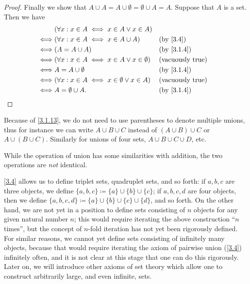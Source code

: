 \begin{proof}
  Finally we show that \(A \cup A = A \cup \emptyset = \emptyset \cup A = A\).
  Suppose that \(A\) is a set.
  Then we have
  \begin{align*}
         & (\forall x : x \in A \iff x \in A \lor x \in A)                                      \\
    \iff & (\forall x : x \in A \iff x \in A \cup A)               &  & \text{(by \cref{3.4})}  \\
    \iff & (A = A \cup A)                                          &  & \by{3.1.4}              \\
    \iff & (\forall x : x \in A \iff x \in A \lor x \in \emptyset) &  & \text{(vacuously true)} \\
    \iff & A = A \cup \emptyset                                    &  & \by{3.1.4}              \\
    \iff & (\forall x : x \in A \iff x \in \emptyset \lor x \in A) &  & \text{(vacuously true)} \\
    \iff & A = \emptyset \cup A.                                   &  & \by{3.1.4}
  \end{align*}
\end{proof}

\begin{note}
  Because of \cref{3.1.13}, we do not need to use parentheses to denote multiple unions, thus for instance we can write \(A \cup B \cup C\) instead of \((A \cup B) \cup C\) or \(A \cup (B \cup C)\).
  Similarly for unions of four sets, \(A \cup B \cup C \cup D\), etc.
\end{note}

\begin{rmk}\label{3.1.14}
  While the operation of union has some similarities with addition, the two operations are \emph{not} identical.
\end{rmk}

\begin{note}
  \cref{3.4} allows us to define triplet sets, quadruplet sets, and so forth: if \(a, b, c\) are three objects, we define \(\{a, b, c\} \coloneqq \{a\} \cup \{b\} \cup \{c\}\);
  if \(a, b, c, d\) are four objects, then we define \(\{a, b, c, d\} \coloneqq \{a\} \cup \{b\} \cup \{c\} \cup \{d\}\), and so forth.
  On the other hand, we are not yet in a position to define sets consisting of \(n\) objects for any given natural number \(n\);
  this would require iterating the above construction ``\(n\) times'', but the concept of \(n\)-fold iteration has not yet been rigorously defined.
  For similar reasons, we cannot yet define sets consisting of infinitely many objects, because that would require iterating the axiom of pairwise union (\cref{3.4}) infinitely often, and it is not clear at this stage that one can do this rigorously.
  Later on, we will introduce other axioms of set theory which allow one to construct arbitrarily large, and even infinite, sets.
\end{note}


